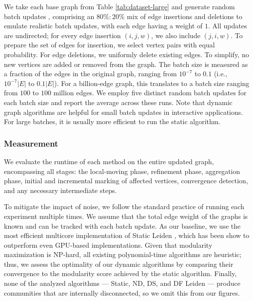 We take each base graph from Table \ref{tab:dataset-large} and generate random batch updates \cite{com-zarayeneh21}, comprising an $80\% : 20\%$ mix of edge insertions and deletions to emulate realistic batch updates, with each edge having a weight of $1$. All updates are undirected; for every edge insertion $(i, j, w)$, we also include $(j, i, w)$. To prepare the set of edges for insertion, we select vertex pairs with equal probability. For edge deletions, we uniformly delete existing edges. To simplify, no new vertices are added or removed from the graph. The batch size is measured as a fraction of the edges in the original graph, ranging from $10^{-7}$ to $0.1$ (i.e., $10^{-7}|E|$ to $0.1|E|$). For a billion-edge graph, this translates to a batch size ranging from $100$ to $100$ million edges. We employ five distinct random batch updates for each batch size and report the average across these runs. Note that dynamic graph algorithms are helpful for small batch updates in interactive applications. For large batches, it is usually more efficient to run the static algorithm.


\subsubsection{Measurement}
\label{sec:measurement}

We evaluate the runtime of each method on the entire updated graph, encompassing all stages: the local-moving phase, refinement phase, aggregation phase, initial and incremental marking of affected vertices, convergence detection, and any necessary intermediate steps. To mitigate the impact of noise, we follow the standard practice of running each experiment multiple times. We assume that the total edge weight of the graphs is known and can be tracked with each batch update. As our baseline, we use the most efficient multicore implementation of Static Leiden \cite{sahu2024fast}, which has been show to outperform even GPU-based implementations. Given that modularity maximization is NP-hard, all existing polynomial-time algorithms are heuristic; thus, we assess the optimality of our dynamic algorithms by comparing their convergence to the modularity score achieved by the static algorithm. Finally, none of the analyzed algorithms --- Static, ND, DS, and DF Leiden --- produce communities that are internally disconnected, so we omit this from our figures.

